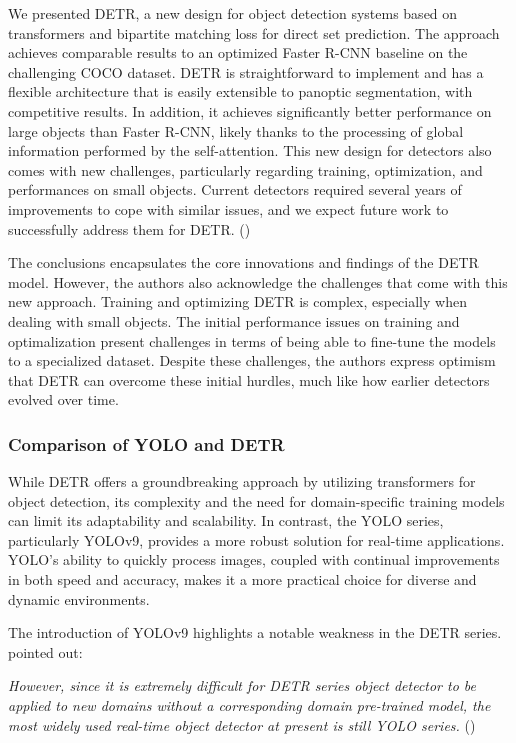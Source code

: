 \begin{myquote}
    We presented DETR, a new design for object detection systems based on transformers and bipartite matching loss for direct set prediction. The approach achieves comparable results to an optimized Faster R-CNN baseline on the challenging COCO dataset. DETR is straightforward to implement and has a flexible architecture that is easily extensible to panoptic segmentation, with competitive results. In addition, it achieves significantly better performance on large objects than Faster R-CNN, likely thanks to the processing of global information performed by the self-attention. This new design for detectors also comes with new challenges, particularly regarding training, optimization, and performances on small objects. Current detectors required several years of improvements to cope with similar issues, and we expect future work to successfully address them for DETR. (\cite{carion2020endtoend})
\end{myquote}

The conclusions encapsulates the core innovations and findings of the DETR model. However, the authors also acknowledge the challenges that come with this new approach. Training and optimizing DETR is complex, especially when dealing with small objects. The initial performance issues on training and optimalization present challenges in terms of being able to fine-tune the models to a specialized dataset. Despite these challenges, the authors express optimism that DETR can overcome these initial hurdles, much like how earlier detectors evolved over time. 

\subsubsection{Comparison of YOLO and DETR}

While DETR offers a groundbreaking approach by utilizing transformers for object detection, its complexity and the need for domain-specific training models can limit its adaptability and scalability. In contrast, the YOLO series, particularly YOLOv9, provides a more robust solution for real-time applications. YOLO's ability to quickly process images, coupled with continual improvements in both speed and accuracy, makes it a more practical choice for diverse and dynamic environments.

The introduction of YOLOv9 highlights a notable weakness in the DETR series. \citeauthor{wang2024yolov9} pointed out:

\textit{However, since it is extremely difficult for DETR series object detector to be applied to new domains without a corresponding domain pre-trained model, the most widely used real-time object detector at present is still YOLO series.} (\citeyear{wang2024yolov9})

